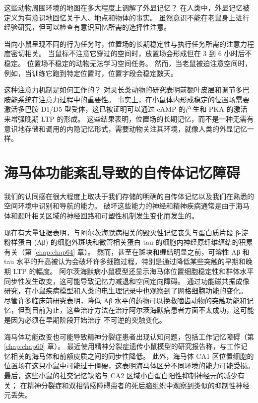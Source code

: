 这些动物周围环境的地图在多大程度上调解了外显记忆？ 在人类中，外显记忆被定义为有意识地回忆关于人、地点和物体的事实。 虽然意识不能在老鼠身上进行经验研究，但可以检查有意识回忆所需的选择性注意。

当向小鼠呈现不同的行为任务时，位置场的长期稳定性与执行任务所需的注意力程度密切相关。 当鼠标不注意它穿过的空间时，放置场会形成但在 3 到 6 小时后不稳定。 位置场不稳定的动物无法学习空间任务。 然而，当老鼠被迫注意空间时，例如，当训练它跑到特定位置时，位置字段会稳定数天。

这种注意力机制是如何工作的？ 对灵长类动物的研究表明前额叶皮层和调节多巴胺能系统在注意力过程中的重要性。 事实上，在小鼠体内形成稳定的位置场需要激活多巴胺 D1/D5 型受体，这已被证明可以通过 cAMP 的产生和 PKA 的激活来增强晚期 LTP 的形成。 这些结果表明，位置场的长期记忆，而不是一种无需有意识地存储和调用的内隐记忆形式，需要动物关注其环境，就像人类的外显记忆一样。


\section{海马体功能紊乱导致的自传体记忆障碍}

我们的认同感在很大程度上取决于我们存储的明确的自传体记忆以及我们在熟悉的空间环境中识别和导航的能力。 破坏这些能力的神经和精神疾病通常是由于海马体和颞叶相关区域的神经回路和可塑性机制发生变化而发生的。

现在有大量证据表明，与阿尔茨海默病相关的毁灭性记忆丧失与蛋白质片段 β-淀粉样蛋白 (Aβ) 的细胞外斑块和微管相关蛋白 tau 的细胞内神经原纤维缠结的积累有关（第 \ref{chap:chap64} 章）。 然而，甚至在斑块和缠结明显之前，可溶性 Aβ 和 tau 水平的升高被认为会破坏许多细胞过程，特别是通过降低某些突触的早期和晚期 LTP 的幅度。 阿尔茨海默病小鼠模型还显示海马体位置细胞稳定性和群体水平同步性发生改变，这可能导致记忆力减退和空间定向障碍。 通过功能磁共振成像研究，在小鼠疾病模型和人类的电生理记录中也观察到了网格细胞功能的变化。 尽管许多临床前研究表明，降低 Aβ 水平的药物可以挽救啮齿动物的突触功能和记忆，但到目前为止，这些治疗方法在治疗阿尔茨海默病患者方面不太成功，这可能是因为必须在早期阶段开始治疗 不可逆的突触变化。

海马体功能改变也可能导致精神分裂症患者出现认知问题，包括工作记忆障碍（第 \ref{chap:chap60} 章）。 最近使用精神分裂症遗传小鼠模型的研究报告称，与工作记忆相关的海马体和前额皮质之间的同步性降低。 此外，海马体 CA1 区位置细胞的位置场在这只小鼠中可能过于僵硬，这表明海马体区分不同环境的能力可能受损。 最后，这些小鼠的社交记忆缺陷与 CA2 区域小白蛋白阳性抑制神经元的减少有关； 在精神分裂症和双相情感障碍患者的死后脑组织中观察到类似的抑制性神经元丢失。

